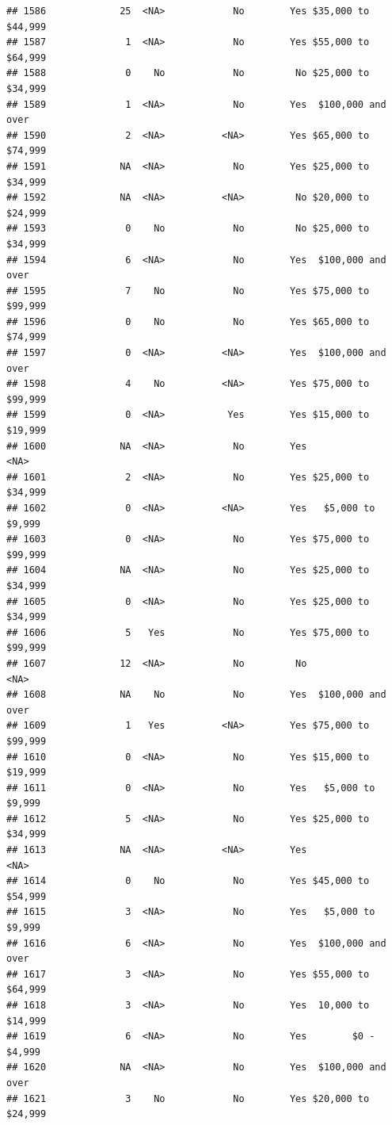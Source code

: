\documentclass[man]{apa6}
\begin{document}
\begin{verbatim}
## 1586             25  <NA>            No        Yes $35,000 to $44,999
## 1587              1  <NA>            No        Yes $55,000 to $64,999
## 1588              0    No            No         No $25,000 to $34,999
## 1589              1  <NA>            No        Yes  $100,000 and over
## 1590              2  <NA>          <NA>        Yes $65,000 to $74,999
## 1591             NA  <NA>            No        Yes $25,000 to $34,999
## 1592             NA  <NA>          <NA>         No $20,000 to $24,999
## 1593              0    No            No         No $25,000 to $34,999
## 1594              6  <NA>            No        Yes  $100,000 and over
## 1595              7    No            No        Yes $75,000 to $99,999
## 1596              0    No            No        Yes $65,000 to $74,999
## 1597              0  <NA>          <NA>        Yes  $100,000 and over
## 1598              4    No          <NA>        Yes $75,000 to $99,999
## 1599              0  <NA>           Yes        Yes $15,000 to $19,999
## 1600             NA  <NA>            No        Yes               <NA>
## 1601              2  <NA>            No        Yes $25,000 to $34,999
## 1602              0  <NA>          <NA>        Yes   $5,000 to $9,999
## 1603              0  <NA>            No        Yes $75,000 to $99,999
## 1604             NA  <NA>            No        Yes $25,000 to $34,999
## 1605              0  <NA>            No        Yes $25,000 to $34,999
## 1606              5   Yes            No        Yes $75,000 to $99,999
## 1607             12  <NA>            No         No               <NA>
## 1608             NA    No            No        Yes  $100,000 and over
## 1609              1   Yes          <NA>        Yes $75,000 to $99,999
## 1610              0  <NA>            No        Yes $15,000 to $19,999
## 1611              0  <NA>            No        Yes   $5,000 to $9,999
## 1612              5  <NA>            No        Yes $25,000 to $34,999
## 1613             NA  <NA>          <NA>        Yes               <NA>
## 1614              0    No            No        Yes $45,000 to $54,999
## 1615              3  <NA>            No        Yes   $5,000 to $9,999
## 1616              6  <NA>            No        Yes  $100,000 and over
## 1617              3  <NA>            No        Yes $55,000 to $64,999
## 1618              3  <NA>            No        Yes  10,000 to $14,999
## 1619              6  <NA>            No        Yes        $0 - $4,999
## 1620             NA  <NA>            No        Yes  $100,000 and over
## 1621              3    No            No        Yes $20,000 to $24,999

\end{verbatim}
\end{document}
